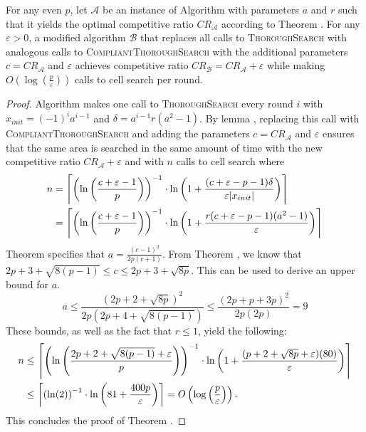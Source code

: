 \begin{theorem} 
    For any even $p$, let $\mathcal{A}$ be an instance of Algorithm  with parameters $a$ and $r$ such that it yields the optimal competitive ratio $CR_{\mathcal{A}}$ according to Theorem . For any $\varepsilon>0$, a modified algorithm $\mathcal{B}$ that replaces all calls to \textsc{ThoroughSearch} with analogous calls to \textsc{CompliantThoroughSearch} with the additional parameters $c=CR_{\mathcal{A}}$ and $\varepsilon$ achieves competitive ratio $CR_{\mathcal{B}} = CR_{\mathcal{A}}+\varepsilon$ while making $O\left(\log\left(\frac{p}{\varepsilon}\right)\right)$ calls to cell search per round.
\end{theorem}
\begin{appendixonly}
\begin{proof}
    Algorithm  makes one call to \textsc{ThoroughSearch} every round $i$ with $x_{init} = (-1)^ia^{i-1}$ and $\delta = a^{i-1}r(a^2-1)$. By lemma , replacing this call with \textsc{Compliant\allowbreak Thorough\allowbreak Search} and adding the parameters $c=CR_{\mathcal{A}}$ and $\varepsilon$ ensures that the same area is searched in the same amount of time with the new competitive ratio $CR_{\mathcal{A}}+\varepsilon$ and with $n$ calls to cell search where
    \begin{align*}
        n &= \ceil*{\left(\ln\left(\frac{c+\varepsilon-1}{p}\right)\right)^{-1}\cdot\ln\left(1+\frac{(c+\varepsilon-p-1)\delta}{\varepsilon |x_{init}|}\right)}\\
        &= \ceil*{\left(\ln\left(\frac{c+\varepsilon-1}{p}\right)\right)^{-1}\cdot\ln\left(1+\frac{r(c+\varepsilon-p-1)(a^2-1)}{\varepsilon}\right)}
    \end{align*}
    Theorem  specifies that $a = \frac{(c-1)^2}{2p(c+1)}$. From Theorem , we know that $2p+3+\sqrt{8(p-1)}\leq c\leq 2p+3+\sqrt{8p}$. This can be used to derive an upper bound for $a$.
    \begin{equation*}
        a \leq \frac{\left(2p+2+\sqrt{8p}\right)^2}{2p\left(2p+4+\sqrt{8(p-1)}\right)}
        \leq \frac{\left(2p+p+3p\right)^2}{2p\left(2p\right)} = 9
    \end{equation*}
    These bounds, as well as the fact that $r\leq1$, yield the following:
    \begin{align*}
        n &\leq \ceil*{\left(\ln\left(\frac{2p+2+\sqrt{8(p-1)}+\varepsilon}{p}\right)\right)^{-1}\cdot\ln\left(1+\frac{(p+2+\sqrt{8p}+\varepsilon)(80)}{\varepsilon}\right)} \\
        &\leq \ceil*{\left(\ln(2)\right)^{-1}\cdot\ln\left(81+\frac{400p}{\varepsilon}\right)}
        = O\left(\log\left(\frac{p}{\varepsilon}\right)\right) .
    \end{align*}
    This concludes the proof of Theorem .
\end{proof}
\end{appendixonly}

